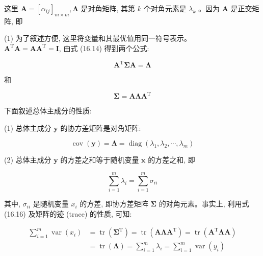 \documentclass[10pt]{article}
\begin{document}
这里 $\boldsymbol{A}=\left[\alpha_{i j}\right]_{m \times m}, \boldsymbol{\Lambda}$ 是对角矩阵, 其第 $k$ 个对角元素是 $\lambda_{k}$ 。因为 $\boldsymbol{A}$ 是正交矩阵, 即

(1) 为了叙述方便, 这里将变量和其最优值用同一符号表示。\\
$\boldsymbol{A}^{\mathrm{T}} \boldsymbol{A}=\boldsymbol{A} \boldsymbol{A}^{\mathrm{T}}=\boldsymbol{I}$, 由式 (16.14) 得到两个公式:


\begin{equation*}
\boldsymbol{A}^{\mathrm{T}} \boldsymbol{\Sigma} \boldsymbol{A}=\boldsymbol{\Lambda} \tag{16.15}
\end{equation*}


和


\begin{equation*}
\boldsymbol{\Sigma}=\boldsymbol{A} \boldsymbol{\Lambda} \boldsymbol{A}^{\mathrm{T}} \tag{16.16}
\end{equation*}


下面叙述总体主成分的性质:

(1) 总体主成分 $\boldsymbol{y}$ 的协方差矩阵是对角矩阵:


\begin{equation*}
\operatorname{cov}(\boldsymbol{y})=\boldsymbol{\Lambda}=\operatorname{diag}\left(\lambda_{1}, \lambda_{2}, \cdots, \lambda_{m}\right) \tag{16.17}
\end{equation*}


(2) 总体主成分 $\boldsymbol{y}$ 的方差之和等于随机变量 $\boldsymbol{x}$ 的方差之和, 即


\begin{equation*}
\sum_{i=1}^{m} \lambda_{i}=\sum_{i=1}^{m} \sigma_{i i} \tag{16.18}
\end{equation*}


其中, $\sigma_{i i}$ 是随机变量 $x_{i}$ 的方差, 即协方差矩阵 $\boldsymbol{\Sigma}$ 的对角元素。事实上, 利用式 (16.16) 及矩阵的迹 (trace) 的性质, 可知:


\begin{align*}
\sum_{i=1}^{m} \operatorname{var}\left(x_{i}\right) & =\operatorname{tr}\left(\boldsymbol{\Sigma}^{\mathrm{T}}\right)=\operatorname{tr}\left(\boldsymbol{A} \boldsymbol{\Lambda} \boldsymbol{A}^{\mathrm{T}}\right)=\operatorname{tr}\left(\boldsymbol{A}^{\mathrm{T}} \boldsymbol{\Lambda} \boldsymbol{A}\right) \\
& =\operatorname{tr}(\boldsymbol{\Lambda})=\sum_{i=1}^{m} \lambda_{i}=\sum_{i=1}^{m} \operatorname{var}\left(y_{i}\right) \tag{16.19}
\end{align*}
\end{document}

